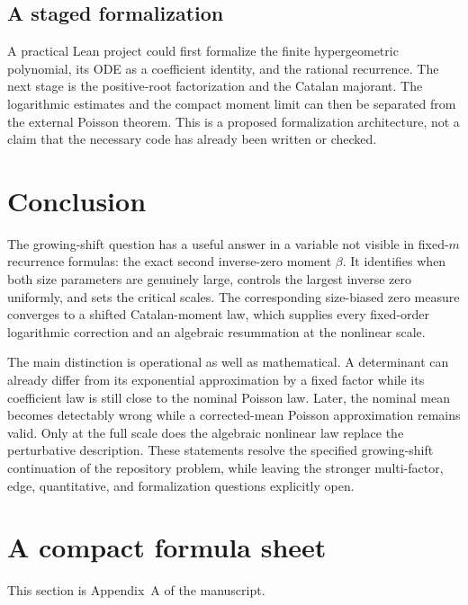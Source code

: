 \documentclass[11pt,a4paper]{article}
\numberwithin{equation}{section}
\theoremstyle{definition}
\theoremstyle{remark}
\begin{document}
\subsection{A staged formalization}\label{gs:x:formal}
A practical Lean project could first formalize the finite hypergeometric
polynomial, its ODE as a coefficient identity, and the rational recurrence.
The next stage is the positive-root factorization and the Catalan
majorant. The logarithmic estimates and the compact moment limit can
then be separated from the external Poisson theorem. This is a proposed
formalization architecture, not a claim that the necessary code has
already been written or checked.

\section{Conclusion}\label{gs:sec:conclusion}

The growing-shift question has a useful answer in a variable not visible
in fixed-$m$ recurrence formulas: the exact second inverse-zero moment
$\beta$. It identifies when both size parameters are genuinely large,
controls the largest inverse zero uniformly, and sets the critical scales.
The corresponding size-biased zero measure converges to a shifted
Catalan-moment law, which supplies every fixed-order logarithmic correction
and an algebraic resummation at the nonlinear scale.

The main distinction is operational as well as mathematical. A determinant
can already differ from its exponential approximation by a fixed factor
while its coefficient law is still close to the nominal Poisson law.
Later, the nominal mean becomes detectably wrong while a corrected-mean
Poisson approximation remains valid. Only at the full scale does the
algebraic nonlinear law replace the perturbative description.
These statements resolve the specified growing-shift continuation of the
repository problem, while leaving the stronger multi-factor, edge,
quantitative, and formalization questions explicitly open.

\section{A compact formula sheet}\label{gs:app:formulas}

This section is Appendix~A of the manuscript.
\end{document}

